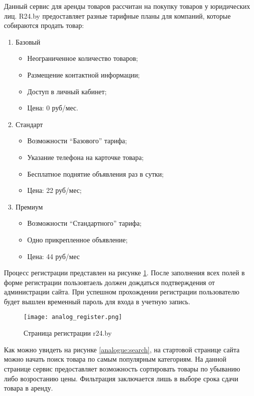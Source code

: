 Данный сервис для аренды товаров рассчитан на покупку товаров у юридических лиц.
R24.by предоставляет разные тарифные планы для компаний, которые собираются продать товар:
\begin{enumerate}[label=\arabic*)]
  \item Базовый
  \begin{itemize}
    \item Неограниченное количество товаров;
    \item Размещение контактной информации;
    \item Доступ в личный кабинет;
    \item Цена: 0 руб/мес.
  \end{itemize}
  \item Стандарт
  \begin{itemize}
    \item Возможности “Базового” тарифа;
    \item Указание телефона на карточке товара;
    \item Бесплатное поднятие объявления раз в сутки;
    \item Цена: 22 руб/мес;
  \end{itemize}
  \item Премиум
  \begin{itemize}
    \item Возможности “Стандартного” тарифа;
    \item Одно прикрепленное объявление;
    \item Цена: 44 руб/мес
  \end{itemize}
\end{enumerate}
\bigbreak

Процесс регистрации представлен на рисунке \ref{analogue:reg}.
После заполнения всех полей в форме регистрации пользовтаель должен дождаться подтверждения от администрации сайта.
При успешном прохождении регистрации пользователю будет вышлен временный пароль для входа в учетную запись.

\begin{figure}[ht]
  \centering
      \texttt{[image: analog\_register.png]}
      \caption{Страница регистрации r24.by}
      \label{analogue:reg}
\end{figure}

Как можно увидеть на рисунке \ref{analogue:search}, на стартовой странице сайта можно начать поиск товара по самым популярным категориям.
На данной странице сервис предоставляет возможность сортировать товары по убыванию либо возростанию цены.
Фильтрация заключается лишь в выборе срока сдачи товара в аренду.

